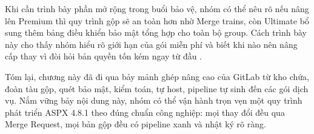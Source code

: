 Khi cần trình bày phần mở rộng trong buổi bảo vệ, nhóm có thể nêu rõ nếu nâng lên Premium thì quy trình gộp sẽ an toàn hơn nhờ Merge trains, còn Ultimate bổ sung thêm bảng điều khiển bảo mật tổng hợp cho toàn bộ group. Cách trình bày này cho thấy nhóm hiểu rõ giới hạn của gói miễn phí và biết khi nào nên nâng cấp thay vì đòi hỏi bản quyền tốn kém ngay từ đầu \cite{ghactions}.

Tóm lại, chương này đã đi qua bảy mảnh ghép nâng cao của GitLab từ kho chứa, đoàn tàu gộp, quét bảo mật, kiểm toán, tự host, pipeline tự sinh đến các gói dịch vụ. Nắm vững bảy nội dung này, nhóm có thể vận hành trọn vẹn một quy trình phát triển ASPX 4.8.1 theo đúng chuẩn công nghiệp: mọi thay đổi đều qua Merge Request, mọi bản gộp đều có pipeline xanh và nhật ký rõ ràng.